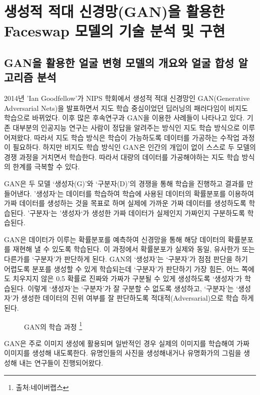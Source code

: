 \documentclass{oblivoir}
\begin{document}
\chapter{ 생성적 적대 신경망(GAN)을 활용한 Faceswap 모델의 기술 분석 및 구현}


\section{ GAN을 활용한 얼굴 변형 모델의 개요와 얼굴 합성 알고리즘 분석}
2014년 'Ian Goodfellow'가 NIPS 학회에서 생성적 적대 신경망인 GAN(Generative Adversarial Nets)을 발표하면서 지도 학습 중심이었던 딥러닝의 패러다임이 비지도 학습으로 바뀌었다. 이후 많은 후속연구과 GAN을 이용한 사례들이 나타나고 있다. 기존 대부분의 인공지능 연구는 사람이 정답을 알려주는 방식인 지도 학습 방식으로 이루어져왔다. 따라서 지도 학습 방식은 학습이 가능하도록 데이터를 가공하는 수작업 과정이 필요하다. 하지만 비지도 학습 방식인 GAN은 인간의 개입이 없이 스스로 두 모델의 경쟁 과정을 거치면서 학습한다. 따라서 대량의 데이터를 가공해야하는 지도 학습 방식의 한계를 극복할 수 있다.

GAN은 두 모델 ‘생성자(G)’와 ‘구분자(D)’의 경쟁을 통해 학습을 진행하고 결과를 만들어낸다. '생성자‘는 데이터를 학습하여 학습에 사용된 데이터의 확률분포를 이용하여 가짜 데이터를 생성하는 것을 목표로 하며 실제에 가까운 가짜 데이터를 생성하도록 학습된다. ’구분자‘는 ’생성자‘가 생성한 가짜 데이터가 실제인지 가짜인지 구분하도록 학습된다.

GAN은 데이터가 이루는 확률분포를 예측하여 신경망을 통해 해당 데이터의 확률분포를 재현해 낼 수 있도록 학습된다. 이 과정에서 확률분포가 실제와 동일, 유사한가 또는 다른가를 ‘구분자’가 판단하게 된다. GAN의 ‘생성자’는 ‘구분자’가 점점 판단을 하기 어렵도록 분포를 생성할 수 있게 학습되는데 ‘구분자’가 판단하기 가장 힘든, 어느 쪽에도 치우지지 않은 0.5 확률로 진짜와 가짜가 구분될 수 있게 생성하도록 ‘생성자’가 학습된다. 이렇게 ‘생성자’는 ‘구분자’가 잘 구분할 수 없도록 생성하고, ‘구분자’는 ‘생성자’가 생성한 데이터의 진위 여부를 잘 판단하도록 적대적(Adversarial)으로 학습 하게 된다.

\begin{figure}[h!]
\centering
\caption{GAN의 학습 과정 \protect\footnote{출처:네이버랩스}}
\end{figure}



GAN은 주로 이미지 생성에 활용되며 일반적인 경우 실제의 이미지를 학습해여 가짜 이미지를 생성해 내도록한다. 유명인들의 사진을 생성해내거나 유명화가의 그림을 생성해 내는 연구들이 진행되어왔다.
\end{document}

